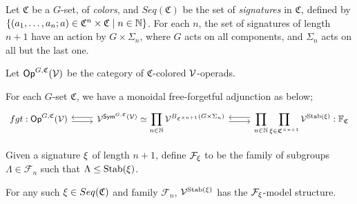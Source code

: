 \documentclass[psamsfonts,oneside,10pt,letterpaper
,draft
]{amsart}%
\renewcommand{\C}{\ensuremath{\mathfrak{C}}}
\renewcommand{\F}{\mathcal F}
\newcommand{\FF}{\ensuremath{\mathbb{F}}}
\renewcommand{\1}{\ensuremath{\mathbb{id}}}
\newcommand{\N}{\mathbb N}
\begin{document}
Let $\C$ be a $G$-set, of {\em colors}, and $Seq(\C)$ be the set of {\em signatures} in $\C$, defined by
$\sets{
  (a_1,\ldots, a_n; a)\in \C^n\times\C
}
{n\in\mathbb{N}}$.
For each $n$, the set of signatures of length $n+1$ have an action by $G\times \Sigma_n$, where $G$ acts on all components, and $\Sigma_n$ acts on all but the last one. 


\begin{definition}
      Let $\mathsf{Op}^{G,\mathfrak C}(\mathcal V)$ be the category of $\C$-colored $\mathcal V$-operads.
\end{definition}

For each $G$-set $\C$, we have a monoidal free-forgetful adjunction as below;
\begin{equation}
      \begin{tikzcd}
            fgt: \Op^{G,\mathfrak C}(\V) \arrow[r, shift right]
            &
            \V^{\Sym^{G,\mathfrak C}(\V)} \simeq
            \displaystyle\prod_{n \in \N} \V^{B_{\mathfrak C^{\times n+1}}(G \times \Sigma_n)}
            \arrow[l, shift right]
            \arrow[r, shift right]
            &
            \displaystyle\prod_{n\in\N}\displaystyle\prod_{\ksi\in \C^{\times n+1}}\V^{\Stab(\ksi)}
            \arrow[l, shift right]
            : \FF_\C
      \end{tikzcd}
\end{equation}

Given a signature $\xi$ of length $n+1$, define $\F_\ksi$ to be the family of subgroups $\Lambda\in \F_n$ such that $\Lambda\leq \mathrm{Stab}(\xi)$.
\begin{corollary}
      For any such $\ksi\in Seq(\C)$ and family $\F_n$, $\mathcal V^{\mathrm{Stab}(\xi)}$ has the $\F_\ksi$-model structure.
\end{corollary}
\end{document}

